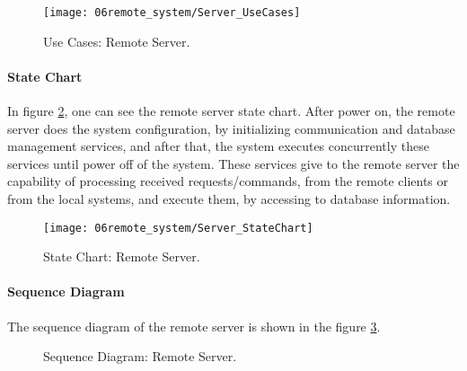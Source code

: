 \begin{figure}[H]
	\centering
	\texttt{[image: 06remote\_system/Server\_UseCases]}
	\caption{Use Cases: Remote Server.}
	\label{fig:UseCases_Server}
\end{figure}

\paragraph*{State Chart}
In figure \ref{fig:StateChart_Server}, one can see the remote server state chart. After power on, the remote server does the system configuration, by initializing communication and database management services, and after that, the system executes concurrently these services until power off of the system. These services give to the remote server the capability of processing received requests/commands, from the remote clients or from the local systems, and execute them, by accessing to database information.

\begin{figure}[H]
	\centering
	\texttt{[image: 06remote\_system/Server\_StateChart]}
	\caption{State Chart: Remote Server.}
	\label{fig:StateChart_Server}
\end{figure}

\paragraph*{Sequence Diagram}
The sequence diagram of the remote server is shown in the figure \ref{fig:SeqDiagram_Server}. 

\begin{figure}[H]
	\centering
	\caption{Sequence Diagram: Remote Server.}
	\label{fig:SeqDiagram_Server}
\end{figure}